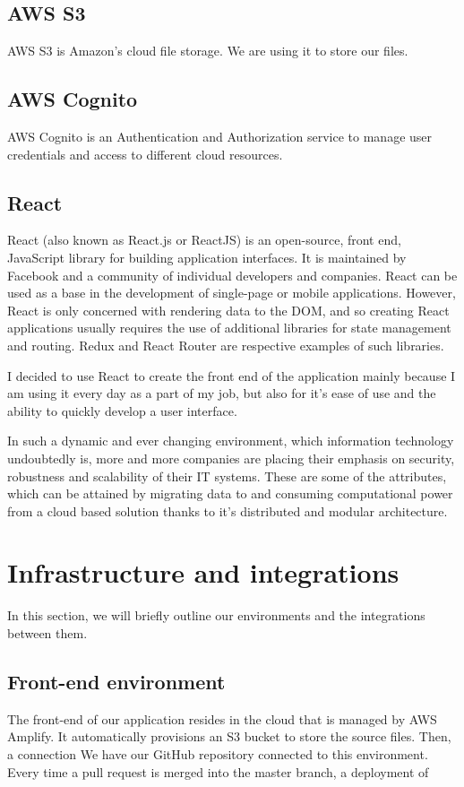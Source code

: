 \documentclass[12pt,oneside]{fithesis2}
\begin{document}
\subsection*{AWS S3}
AWS S3 is Amazon's cloud file storage. We are using it to store our files.
\subsection*{AWS Cognito}
AWS Cognito is an Authentication and Authorization service to manage user credentials and access to different cloud resources.
\subsection*{React}
React (also known as React.js or ReactJS) is an open-source, front end, JavaScript library for building application interfaces. It is maintained by Facebook and a community of individual developers and companies. React can be used as a base in the development of single-page or mobile applications. However, React is only concerned with rendering data to the DOM, and so creating React applications usually requires the use of additional libraries for state management and routing. Redux and React Router are respective examples of such libraries.
\par
I decided to use React to create the front end of the application mainly because I am using it every day as a part of my job, but also for it's ease of use and the ability to quickly develop a user interface.

In such a dynamic and ever changing environment, which information technology undoubtedly is, more and more companies are placing their emphasis on security, robustness and scalability of their IT systems. These are some of the attributes, which can be attained by migrating data to and consuming computational power from a cloud based solution thanks to it's distributed and modular architecture.

\section{Infrastructure and integrations}
In this section, we will briefly outline our environments and the integrations between them.
\subsection{Front-end environment}
The front-end of our application resides in the cloud that is managed by AWS Amplify. It automatically provisions an S3 bucket to store the source files. Then, a connection 
We have our GitHub repository connected to this environment. Every time a pull request is merged into the master branch, a deployment of 
\end{document}
